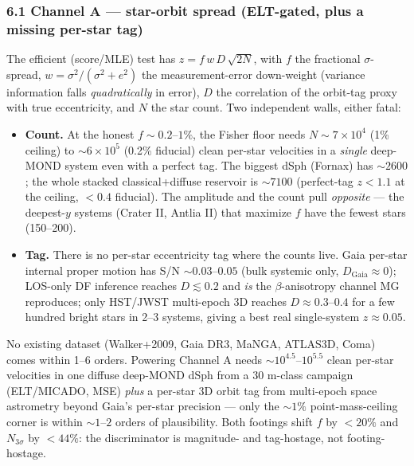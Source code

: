 \documentclass[
]{article}
\providecommand{\tightlist}{%
  \setlength{\itemsep}{0pt}\setlength{\parskip}{0pt}}
\begin{document}
\subsubsection{6.1 Channel A --- star-orbit spread (ELT-gated, plus a
missing per-star
tag)}\label{channel-a-star-orbit-spread-elt-gated-plus-a-missing-per-star-tag}

The efficient (score/MLE) test has \(z=f\,w\,D\,\sqrt{2N}\), with \(f\)
the fractional \(\sigma\)-spread, \(w=\sigma^2/(\sigma^2+e^2)\) the
measurement-error down-weight (variance information falls
\emph{quadratically} in error), \(D\) the correlation of the orbit-tag
proxy with true eccentricity, and \(N\) the star count. Two independent
walls, either fatal:

\begin{itemize}
\tightlist
\item
  \textbf{Count.} At the honest \(f\sim0.2\)--\(1\%\), the Fisher floor
  needs \(N\sim7\times10^4\) (1\% ceiling) to \(\sim6\times10^5\) (0.2\%
  fiducial) clean per-star velocities in a \emph{single} deep-MOND
  system even with a perfect tag. The biggest dSph (Fornax) has
  \(\sim2600\); the whole stacked classical+diffuse reservoir is
  \(\sim7100\) (perfect-tag \(z<1.1\) at the ceiling, \(<0.4\)
  fiducial). The amplitude and the count pull \emph{opposite} --- the
  deepest-\(y\) systems (Crater II, Antlia II) that maximize \(f\) have
  the fewest stars (150--200).
\item
  \textbf{Tag.} There is no per-star eccentricity tag where the counts
  live. Gaia per-star internal proper motion has S/N
  \(\sim0.03\)--\(0.05\) (bulk systemic only, \(D_\mathrm{Gaia}\approx0\));
  LOS-only DF inference reaches \(D\lesssim0.2\) and \emph{is} the
  \(\beta\)-anisotropy channel MG reproduces; only HST/JWST multi-epoch
  3D reaches \(D\approx0.3\)--\(0.4\) for a few hundred bright stars in
  2--3 systems, giving a best real single-system \(z\approx0.05\).
\end{itemize}

No existing dataset (Walker+2009, Gaia DR3, MaNGA, ATLAS3D, Coma) comes
within 1--6 orders. Powering Channel A needs
\(\sim10^{4.5}\)--\(10^{5.5}\) clean per-star velocities in one diffuse
deep-MOND dSph from a 30 m-class campaign (ELT/MICADO, MSE) \emph{plus}
a per-star 3D orbit tag from multi-epoch space astrometry beyond Gaia's
per-star precision --- only the \(\sim1\%\) point-mass-ceiling corner is
within \(\sim1\)--\(2\) orders of plausibility. Both footings shift
\(f\) by \(<20\%\) and \(N_{3\sigma}\) by \(<44\%\): the discriminator
is magnitude- and tag-hostage, not footing-hostage.
\end{document}
